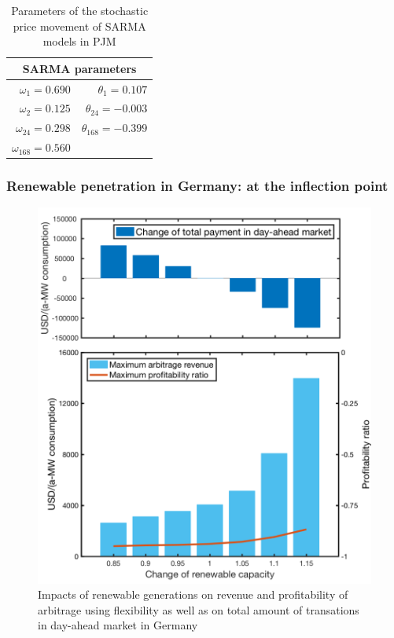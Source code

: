 \begin{table}[h!]
	\centering
	\begin{tabular}{r r}
		\hline
		\multicolumn{2}{c}{SARMA parameters}\\
		\hline
		$\omega_1 = 0.690$ & $\theta_1 = 0.107$ \\
		$\omega_2 = 0.125$ & $\theta_{24} =-0.003$ \\
		$\omega_{24} = 0.298$ & $\theta_{168} = -0.399$ \\
		$\omega_{168} = 0.560$ & \\
		\hline
	\end{tabular}
	\caption{Parameters of the stochastic price movement of SARMA models in PJM}\label{tab:SARMA_PJM}
\end{table}


\subsubsection{Renewable penetration in Germany: at the inflection point}


\begin{figure}[h!]
	\centering
	\includegraphics[width=0.95\linewidth]{Figures/RenewablePenetration_Germany}
	\caption{Impacts of renewable generations on revenue and profitability of arbitrage using flexibility as well as on total amount of transations in day-ahead market in Germany}
	\label{fig:renew_germany}
\end{figure}

